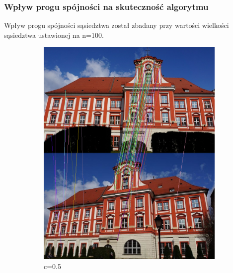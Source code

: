 \documentclass{article}
\begin{document}
	\subsubsection{Wpływ progu spójności na skuteczność algorytmu}
	Wpływ progu spójności sąsiedztwa został zbadany przy wartości wielkości sąsiedztwa ustawionej na n=100.
	\begin{figure}[H]
		\centering
		\begin{subfigure}[b]{0.4\linewidth}
			\includegraphics[width=\linewidth]{c05.png}
			\caption{c=0.5}
		\end{subfigure}
		\begin{subfigure}[b]{0.4\linewidth}

\end{subfigure}
\end{figure}
\end{document}
